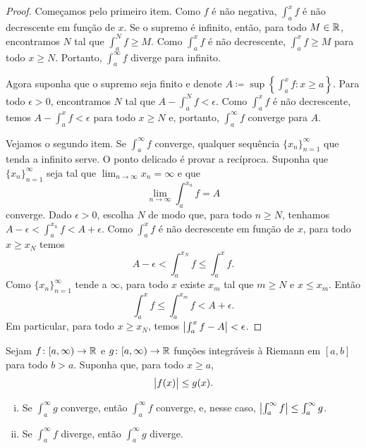 \begin{proof}
Começamos pelo primeiro item.
Como $f$ é não negativa,
$\int_a^x f$ é não decrescente em função de $x$.
Se o supremo é infinito, então, para todo $M \in {\mathbb{R}}$,
encontramos $N$ tal que $\int_a^N f \geq M$. Como $\int_a^x f$
é não decrescente, $\int_a^x f \geq M$ para todo $x \geq N$. Portanto,
$\int_a^\infty f$ diverge para infinito.

Agora suponha que o supremo seja finito e denote
$A \coloneqq \sup \left\{ \int_a^x f : x \geq a \right\}$.
Para todo $\epsilon > 0$, encontramos $N$ tal que
$A - \int_a^N f < \epsilon$. Como $\int_a^x f$ é não decrescente,
temos
$A - \int_a^x f < \epsilon$ para todo $x \geq N$ e, portanto,
$\int_a^\infty f$ converge para $A$.

Vejamos o segundo item.
Se $\int_a^\infty f$ converge, qualquer sequência $\{ x_n \}_{n=1}^\infty$ que tenda a
infinito serve. O ponto delicado é provar a recíproca.
Suponha que $\{ x_n \}_{n=1}^\infty$ seja tal que
$\lim_{n\to\infty} x_n = \infty$ e que
\begin{equation*}
\lim_{n\to\infty} \int_a^{x_n} f = A
\end{equation*}
converge. Dado $\epsilon > 0$, escolha $N$ de modo que, para
todo $n \geq N$, tenhamos
$A - \epsilon < \int_a^{x_n} f < A + \epsilon$.
Como $\int_a^x f$ é não decrescente em função de $x$, para todo
$x \geq x_N$ temos
\begin{equation*}
A - \epsilon < \int_a^{x_N} f \leq \int_a^x f .
\end{equation*}
Como $\{ x_n \}_{n=1}^\infty$ tende a $\infty$, para todo $x$
existe $x_m$ tal que $m \geq N$ e $x \leq x_m$. Então
\begin{equation*}
\int_a^{x} f \leq \int_a^{x_m} f < A + \epsilon .
\end{equation*}
Em particular, para todo $x \geq x_N$, temos
$\left\lvert {\int_a^{x} f - A} \right\rvert < \epsilon$.
\end{proof}

\begin{prop}%
Sejam
$f \colon [a,\infty) \to {\mathbb{R}}$ e
$g \colon [a,\infty) \to {\mathbb{R}}$ funções
integráveis à Riemann em $[a,b]$ para todo $b > a$. Suponha
que, para todo $x \geq a$,
\begin{equation*}
\bigl\lvert {f(x)} \bigr\rvert \leq g(x) .
\end{equation*}
\begin{enumerate}[(i)]
\item Se $\int_a^\infty g$ converge, então $\int_a^\infty f$ converge,
e, nesse caso,
$\left\lvert {\int_a^\infty f} \right\rvert \leq \int_a^\infty g$.
\item Se $\int_a^\infty f$ diverge, então $\int_a^\infty g$ diverge.
\end{enumerate}
\end{prop}

